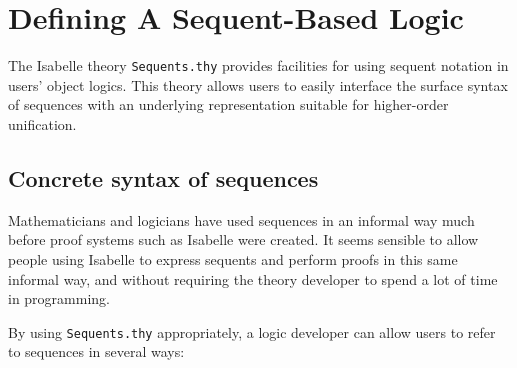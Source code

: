 \chapter{Defining A Sequent-Based Logic}
\label{chap:sequents}

\underscoreon %

The Isabelle theory \texttt{Sequents.thy} provides facilities for using
sequent notation in users' object logics. This theory allows users to
easily interface the surface syntax of sequences with an underlying
representation suitable for higher-order unification.

\section{Concrete syntax of sequences}

Mathematicians and logicians have used sequences in an informal way
much before proof systems such as Isabelle were created. It seems
sensible to allow people using Isabelle to express sequents and
perform proofs in this same informal way, and without requiring the
theory developer to spend a lot of time in \ML{} programming.

By using {\tt Sequents.thy}
appropriately, a logic developer can allow users to refer to sequences
in several ways:
%

